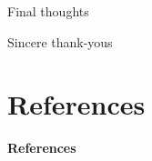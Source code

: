 \documentclass[serif]{beamer}\usepackage[]{graphicx}\usepackage[]{color}
\begin{document}
\begin{frame}{Final thoughts}{}

\end{frame}

\begin{frame}{Sincere thank-yous}{}

\end{frame}

\section{References}
\begin{frame}[allowframebreaks,t]{\textbf{References}}
\tiny
{}


\end{frame}
\end{document}
